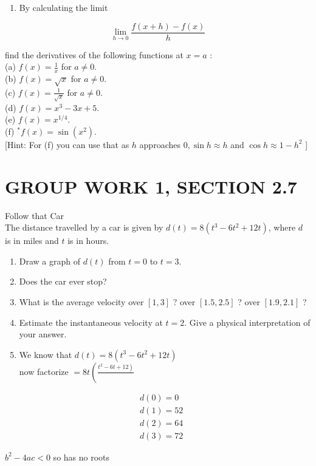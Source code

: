 \documentclass[10pt]{article}
\begin{document}
\begin{enumerate}
  \item By calculating the limit
\end{enumerate}

$$
\lim _{h \rightarrow 0} \frac{f(x+h)-f(x)}{h}
$$

find the derivatives of the following functions at $x=a$ :\\
(a) $f(x)=\frac{1}{x}$ for $a \neq 0$.\\
(b) $f(x)=\sqrt{x}$ for $a \neq 0$.\\
(c) $f(x)=\frac{1}{\sqrt{x}}$ for $a \neq 0$.\\
(d) $f(x)=x^{3}-3 x+5$.\\
(e) $f(x)=x^{1 / 4}$.\\
(f) ${ }^{*} f(x)=\sin \left(x^{2}\right)$.\\[0pt]
[Hint: For (f) you can use that as $h$ approaches $0, \sin h \approx h$ and $\cos h \approx 1-h^{2}$ ]

\section*{GROUP WORK 1, SECTION 2.7}
Follow that Car\\
The distance travelled by a car is given by $d(t)=8\left(t^{3}-6 t^{2}+12 t\right)$, where $d$ is in miles and $t$ is in hours.

\begin{enumerate}
  \item Draw a graph of $d(t)$ from $t=0$ to $t=3$.
  \item Does the car ever stop?
  \item What is the average velocity over $[1,3]$ ? over $[1.5,2.5]$ ? over $[1.9,2.1]$ ?
  \item Estimate the instantaneous velocity at $t=2$. Give a physical interpretation of your answer.
  \item We know that $d(t)=8\left(t^{3}-6 t^{2}+12 t\right)$\\
now factorize $=8 t\left(\frac{\left.t^{2}-6 t+12\right)}{}\right.$
\end{enumerate}

$$
\begin{aligned}
& d(0)=0 \\
& d(1)=52 \\
& d(2)=64 \\
& d(3)=72
\end{aligned}
$$

$b^{2}-4 a c<0$ so has no roots
\end{document}
